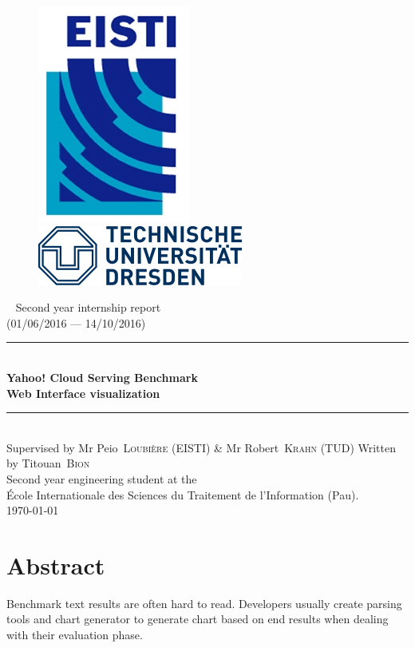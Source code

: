 \documentclass[a4paper,11pt]{report}
\newcommand*{\HRule}{\rule{\linewidth}{0.4mm}}  %
\newcommand*{\auteur}[2]{\large #1~\textsc{#2}} %
\newcommand{\pretitre}{Second year internship report \\ (01/06/2016 --- 14/10/2016)}
\newcommand{\grostitre}{Yahoo! Cloud Serving Benchmark \\ Web Interface visualization}
\newcommand{\auteurs}{Written by \auteur{Titouan}{Bion} \\ Second year engineering student at the \\ École Internationale des Sciences du Traitement de l'Information (Pau).}
\newcommand{\correcteurs}{Supervised by Mr \auteur{Peio}{Loubière} (EISTI) \& Mr \auteur{Robert}{Krahn} (TUD)}
\newcommand{\madate}{\today} %
\begin{document}


\begin{titlepage}
\begin{figure}[h]
\includegraphics[scale=1]{images/Logo_EISTI.png}
\hfill
\includegraphics[scale=0.6]{images/Logo_TUD.png}
\end{figure}
  \begin{center}
    ~
    \vfill
    {\Large\pretitre\\}           %
    \vspace{2cm}
    \HRule \\[0.4cm]
    {\Huge\bf\grostitre\\[0.4cm]} %
    \HRule \\[0.4cm]
    \vspace{2cm}
   	\correcteurs
    \medskip
    \vfill
    \auteurs\\                    %
    \vfill
    {\large\madate}               %
  \end{center}
\end{titlepage}

\chapter*{Abstract}

Benchmark text results are often hard to read. Developers usually create parsing tools and chart generator to generate chart based on end results when dealing with their evaluation phase.
\end{document}
